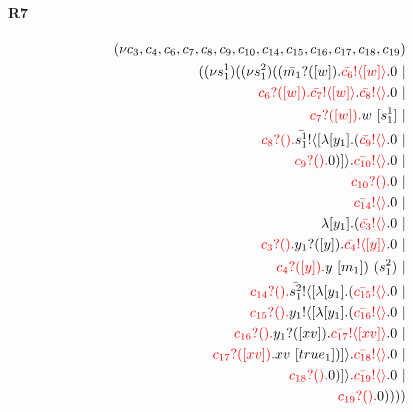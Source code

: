 \documentclass{article}
\begin{document}
\paragraph{R7}
\begin{align*}
 (\nu c_{3},c_{4},c_{6},c_{7},c_{8},c_{9},c_{10},c_{14},c_{15},c_{16},c_{17},c_{18},c_{19}) \\ ( (\nu s^{1}_{1})( (\nu s^{2}_{1})((\color{black}\bar{m_{1}}?([w]).\color{black}\color{red}\bar{c_{6}}! \langle [w] \rangle \color{black}.0  \ | \\ \color{red}c_{6}?([w]).\color{black}\color{red}\bar{c_{7}}! \langle [w] \rangle \color{black}.\color{red}\bar{c_{8}}! \langle  \rangle \color{black}.0  \ | \\ \color{red}c_{7}?([w]).\color{black}w \ [s^{1}_{1}] \ | \\ \color{red}c_{8}?().\color{black}\color{black}\bar{s^{1}_{1}}! \langle [ \lambda [y_{1}].(\color{red}\bar{c_{9}}! \langle  \rangle \color{black}.0  \ | \\ \color{red}c_{9}?().\color{black}0 )] \rangle \color{black}.\color{red}\bar{c_{10}}! \langle  \rangle \color{black}.0  \ | \\ \color{red}c_{10}?().\color{black}0  \ | \\ \color{red}\bar{c_{14}}! \langle  \rangle \color{black}.0  \ | \\  \lambda [y_{1}].(\color{red}\bar{c_{3}}! \langle  \rangle \color{black}.0  \ | \\ \color{red}c_{3}?().\color{black}\color{black}y_{1}?([y]).\color{black}\color{red}\bar{c_{4}}! \langle [y] \rangle \color{black}.0  \ | \\ \color{red}c_{4}?([y]).\color{black}y \ [m_{1}]) \ (s^{2}_{1}) \ | \\ \color{red}c_{14}?().\color{black}\color{black}\bar{s^{2}_{1}}! \langle [ \lambda [y_{1}].(\color{red}\bar{c_{15}}! \langle  \rangle \color{black}.0  \ | \\ \color{red}c_{15}?().\color{black}\color{black}y_{1}! \langle [ \lambda [y_{1}].(\color{red}\bar{c_{16}}! \langle  \rangle \color{black}.0  \ | \\ \color{red}c_{16}?().\color{black}\color{black}y_{1}?([xv]).\color{black}\color{red}\bar{c_{17}}! \langle [xv] \rangle \color{black}.0  \ | \\ \color{red}c_{17}?([xv]).\color{black}xv \ [true_{1}])] \rangle \color{black}.\color{red}\bar{c_{18}}! \langle  \rangle \color{black}.0  \ | \\ \color{red}c_{18}?().\color{black}0 )] \rangle \color{black}.\color{red}\bar{c_{19}}! \langle  \rangle \color{black}.0  \ | \\ \color{red}c_{19}?().\color{black}0 ))))
\end{align*}
\end{document}
